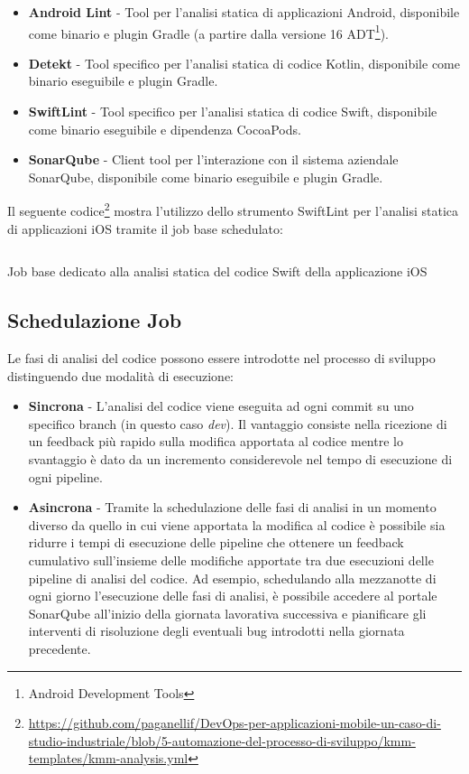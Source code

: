 \begin{itemize}
    \item \textbf{Android Lint}  - Tool per l'analisi statica di applicazioni Android, disponibile come binario e plugin Gradle (a partire dalla versione 16 ADT\footnote{Android Development Tools}).
    \item \textbf{Detekt}  - Tool specifico per l'analisi statica di codice Kotlin, disponibile come binario eseguibile e plugin Gradle.
    \item \textbf{SwiftLint} - Tool specifico per l'analisi statica di codice Swift, disponibile come binario eseguibile e dipendenza CocoaPods.
    \item \textbf{SonarQube} - Client tool per l'interazione con il sistema aziendale SonarQube, disponibile come binario eseguibile e plugin Gradle.
\end{itemize}

Il seguente codice\footnote{\href{https://github.com/paganellif/DevOps-per-applicazioni-mobile-un-caso-di-studio-industriale/blob/5-automazione-del-processo-di-sviluppo/kmm-templates/kmm-analysis.yml}{https://github.com/paganellif/DevOps-per-applicazioni-mobile-un-caso-di-studio-industriale/blob/5-automazione-del-processo-di-sviluppo/kmm-templates/kmm-analysis.yml}} mostra l'utilizzo dello strumento SwiftLint per l'analisi statica di applicazioni iOS tramite il job base schedulato:

\begin{listing}[H]
    \inputminted{yaml}{code/ios-sast-job.yaml}
    \caption{Job base dedicato alla analisi statica del codice Swift della applicazione iOS}
\end{listing}

\subsection{Schedulazione Job}
Le fasi di analisi del codice possono essere introdotte nel processo di sviluppo distinguendo due modalità di esecuzione:

\begin{itemize}
    \item \textbf{Sincrona} - L'analisi del codice viene eseguita ad ogni commit su uno specifico branch (in questo caso \textit{dev}). Il vantaggio consiste nella ricezione di un feedback più rapido sulla modifica apportata al codice mentre lo svantaggio è dato da un incremento considerevole nel tempo di esecuzione di ogni pipeline.
    \item \textbf{Asincrona} - Tramite la schedulazione delle fasi di analisi in un momento diverso da quello in cui viene apportata la modifica al codice è possibile sia ridurre i tempi di esecuzione delle pipeline che ottenere un feedback cumulativo sull'insieme delle modifiche apportate tra due esecuzioni delle pipeline di analisi del codice. Ad esempio, schedulando alla mezzanotte di ogni giorno l'esecuzione delle fasi di analisi, è possibile accedere al portale SonarQube all'inizio della giornata lavorativa successiva e pianificare gli interventi di risoluzione degli eventuali bug introdotti nella giornata precedente.
\end{itemize}

